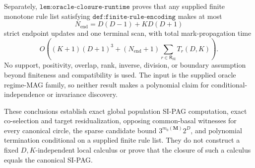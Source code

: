 Separately, \(\texttt{lem:oracle-closure-runtime}\) proves that any supplied finite monotone rule list satisfying \(\texttt{def:finite-rule-encoding}\) makes at most
\[
N_{\mathrm{end}}=D(D-1)+KD(D+1)
\]
strict endpoint updates and one terminal scan, with total mark-propagation time
\[
O\!\left(
(K+1)(D+1)^3+
(N_{\mathrm{end}}+1)
\sum_{r\in\mathsf R_{\mathrm{SI}}}T_r(D,K)
\right).
\]
No support, positivity, overlap, rank, inverse, division, or boundary assumption beyond finiteness and compatibility is used.  The input is the supplied oracle regime-MAG family, so neither result makes a polynomial claim for conditional-independence or invariance discovery.

These conclusions establish exact global population SI-PAG computation, exact co-selection and target residualization, opposing common-basal witnesses for every canonical circle, the sparse candidate bound \(3^{m_0(\mathbf M)}2^D\), and polynomial termination conditional on a supplied finite rule list.  They do not construct a fixed \(D,K\)-independent local calculus or prove that the closure of such a calculus equals the canonical SI-PAG.